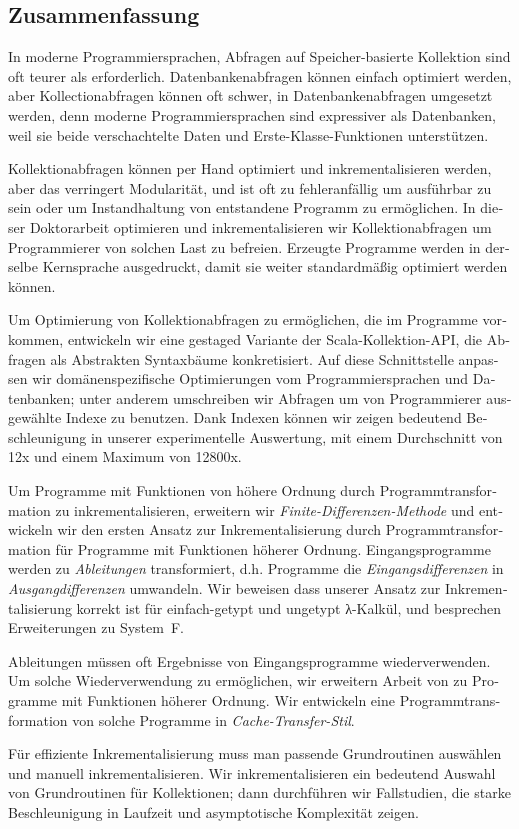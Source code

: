 \begin{otherlanguage}{ngerman}
\chapter{Zusammenfassung}

In moderne Programmiersprachen, Abfragen auf Speicher-basierte Kollektion sind oft
teurer als erforderlich.
Datenbankenabfragen können einfach optimiert werden, aber Kollectionabfragen
können oft schwer, in Datenbankenabfragen umgesetzt werden, denn moderne
Programmiersprachen sind expressiver als Datenbanken, weil sie beide
verschachtelte Daten und Erste-Klasse-Funktionen unterstützen.

Kollektionabfragen können per Hand optimiert und inkrementalisieren werden,
aber das verringert Modularität, und ist oft zu fehleranfällig um
ausführbar zu sein oder um Instandhaltung von entstandene Programm zu ermöglichen.
In dieser Doktorarbeit optimieren und inkrementalisieren wir
Kollektionabfragen um Programmierer von solchen Last zu befreien.
Erzeugte Programme werden in derselbe Kernsprache ausgedruckt, damit sie weiter
standardmäßig optimiert werden können.

Um Optimierung von Kollektionabfragen zu ermöglichen, die im Programme
vorkommen, entwickeln wir eine gestaged Variante der Scala-Kollektion-API, die
Abfragen als Abstrakten Syntaxbäume konkretisiert. Auf diese Schnittstelle
anpassen wir domänenspezifische Optimierungen vom Programmiersprachen und
Datenbanken; unter anderem umschreiben wir Abfragen um
von Programmierer ausgewählte Indexe zu benutzen. Dank Indexen können wir zeigen
bedeutend Beschleunigung in unserer experimentelle Auswertung, mit einem
Durchschnitt von 12x und einem Maximum von 12800x.

Um Programme mit Funktionen von höhere Ordnung durch Programmtransformation zu
inkrementalisieren, erweitern wir \emph{Finite-Differenzen-Methode}
\citep{Paige82FDC,Blakeley:1986:EUM,Gupta99MMV} und entwickeln wir den ersten
Ansatz zur Inkrementalisierung durch Programmtransformation für Programme mit
Funktionen höherer Ordnung. Eingangsprogramme werden zu \emph{Ableitungen}
transformiert, d.h. Programme die \emph{Eingangsdifferenzen} in
\emph{Ausgangdifferenzen} umwandeln.
Wir beweisen dass unserer Ansatz zur Inkrementalisierung korrekt ist für
einfach-getypt und ungetypt λ-Kalkül, und besprechen Erweiterungen zu System~F.

Ableitungen müssen oft Ergebnisse von Eingangsprogramme wiederverwenden. Um
solche Wiederverwendung zu ermöglichen, wir erweitern Arbeit von \citet{Liu95}
zu Programme mit Funktionen höherer Ordnung. Wir entwickeln eine
Programmtransformation von solche Programme in \emph{Cache-Transfer-Stil}.

Für effiziente Inkrementalisierung muss man passende Grundroutinen auswählen und
manuell inkrementalisieren. Wir inkrementalisieren ein bedeutend Auswahl von
Grundroutinen für Kollektionen; dann durchführen wir Fallstudien, die starke
Beschleunigung in Laufzeit und asymptotische Komplexität zeigen.
\end{otherlanguage}

